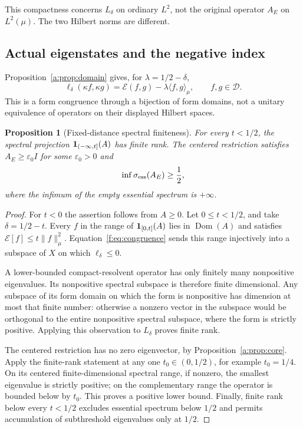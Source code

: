 \documentclass[11pt,a4paper]{article}
\numberwithin{equation}{section}
\newtheorem{proposition}[theorem]{Proposition}
\theoremstyle{definition}\newtheorem{definition}[theorem]{Definition}
\theoremstyle{remark}\newtheorem{remark}[theorem]{Remark}
\newcommand{\E}{\mathcal E}\newcommand{\D}{\mathcal D}
\newcommand{\dom}{\operatorname{Dom}}\newcommand{\Var}{\operatorname{Var}}
\newcommand{\ip}[2]{\langle#1,#2\rangle}\newcommand{\norm}[1]{\lVert#1\rVert}\newcommand{\abs}[1]{\lvert#1\rvert}
\begin{document}
This compactness concerns $L_\delta$ on ordinary $L^2$, not the original operator $A_E$ on $L^2(\mu)$. The two Hilbert norms are different.


\subsection{Actual eigenstates and the negative index}\label{f:sec:spectrum}

Proposition~\ref{a:prop:domain} gives, for $\lambda=1/2-\delta$,
\begin{equation}\label{f:eq:congruence}
 \ell_\delta(\kappa f,\kappa g)
       =\E(f,g)-\lambda\ip{f}{g}_\mu,
       \qquad f,g\in\D.
\end{equation}
This is a form congruence through a bijection of form domains, not a unitary equivalence of operators on their displayed Hilbert spaces.

\begin{proposition}[Fixed-distance spectral finiteness]\label{f:prop:finite}
For every $t<1/2$, the spectral projection $\mathbf1_{(-\infty,t]}(A)$ has finite rank. The centered restriction satisfies $A_E\ge\varepsilon_0 I$ for some $\varepsilon_0>0$ and
\begin{equation}\label{f:eq:essential}
 \inf\sigma_{\operatorname{ess}}(A_E)\ge\frac12,
\end{equation}
where the infimum of the empty essential spectrum is $+\infty$.
\end{proposition}
\begin{proof}
For $t<0$ the assertion follows from $A\ge0$. Let $0\le t<1/2$, and take $\delta=1/2-t$. Every $f$ in the range of $\mathbf1_{[0,t]}(A)$ lies in $\dom(A)$ and satisfies $\E[f]\le t\norm{f}_\mu^2$. Equation~\eqref{f:eq:congruence} sends this range injectively into a subspace of $X$ on which $\ell_\delta\le0$.

A lower-bounded compact-resolvent operator has only finitely many nonpositive eigenvalues. Its nonpositive spectral subspace is therefore finite dimensional. Any subspace of its form domain on which the form is nonpositive has dimension at most that finite number: otherwise a nonzero vector in the subspace would be orthogonal to the entire nonpositive spectral subspace, where the form is strictly positive. Applying this observation to $L_\delta$ proves finite rank.

The centered restriction has no zero eigenvector, by Proposition~\ref{a:prop:core}. Apply the finite-rank statement at any one $t_0\in(0,1/2)$, for example $t_0=1/4$. On its centered finite-dimensional spectral range, if nonzero, the smallest eigenvalue is strictly positive; on the complementary range the operator is bounded below by $t_0$. This proves a positive lower bound. Finally, finite rank below every $t<1/2$ excludes essential spectrum below $1/2$ and permits accumulation of subthreshold eigenvalues only at $1/2$.
\end{proof}
\end{document}
